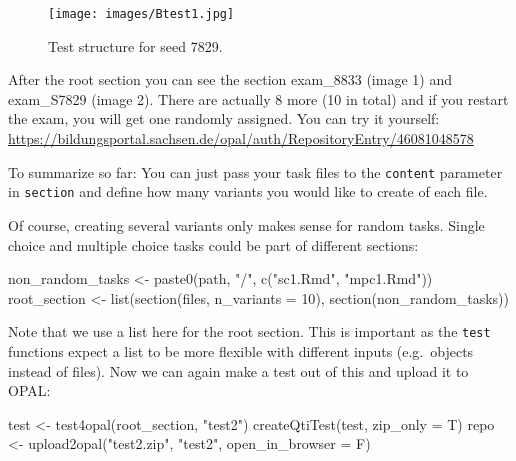 \documentclass[twoside]{tufte-book}
\newenvironment{Shaded}{}{}
\newcommand{\AttributeTok}[1]{\textcolor[rgb]{0.49,0.56,0.16}{#1}}
\newcommand{\DecValTok}[1]{\textcolor[rgb]{0.25,0.63,0.44}{#1}}
\newcommand{\FunctionTok}[1]{\textcolor[rgb]{0.02,0.16,0.49}{#1}}
\newcommand{\NormalTok}[1]{#1}
\newcommand{\OtherTok}[1]{\textcolor[rgb]{0.00,0.44,0.13}{#1}}
\newcommand{\StringTok}[1]{\textcolor[rgb]{0.25,0.44,0.63}{#1}}
\begin{document}
\begin{figure*}
\centering
\texttt{[image: images/Btest1.jpg]}
\caption{\label{b1}Test structure for seed 7829.}
\end{figure*}

After the root section you can see the section exam\_8833 (image 1) and exam\_S7829 (image 2). There are actually 8 more (10 in total) and if you restart the exam, you will get one randomly assigned. You can try it yourself: \url{https://bildungsportal.sachsen.de/opal/auth/RepositoryEntry/46081048578}

To summarize so far: You can just pass your task files to the \texttt{content} parameter in \texttt{section} and define how many variants you would like to create of each file.

Of course, creating several variants only makes sense for random tasks. Single choice and multiple choice tasks could be part of different sections:

\begin{Shaded}
\begin{Highlighting}[]
\NormalTok{non\_random\_tasks }\OtherTok{\textless{}{-}} \FunctionTok{paste0}\NormalTok{(path, }\StringTok{"/"}\NormalTok{, }\FunctionTok{c}\NormalTok{(}\StringTok{"sc1.Rmd"}\NormalTok{, }\StringTok{"mpc1.Rmd"}\NormalTok{))}
\NormalTok{root\_section }\OtherTok{\textless{}{-}} \FunctionTok{list}\NormalTok{(}\FunctionTok{section}\NormalTok{(files, }\AttributeTok{n\_variants =} \DecValTok{10}\NormalTok{),}
                     \FunctionTok{section}\NormalTok{(non\_random\_tasks))}
\end{Highlighting}
\end{Shaded}

Note that we use a list here for the root section. This is important as the \texttt{test} functions expect a list to be more flexible with different inputs (e.g.~objects instead of files). Now we can again make a test out of this and upload it to OPAL:

\begin{Shaded}
\begin{Highlighting}[]
\NormalTok{test }\OtherTok{\textless{}{-}} \FunctionTok{test4opal}\NormalTok{(root\_section, }\StringTok{"test2"}\NormalTok{)}
\FunctionTok{createQtiTest}\NormalTok{(test, }\AttributeTok{zip\_only =}\NormalTok{ T)}
\NormalTok{repo }\OtherTok{\textless{}{-}} \FunctionTok{upload2opal}\NormalTok{(}\StringTok{"test2.zip"}\NormalTok{, }\StringTok{"test2"}\NormalTok{, }\AttributeTok{open\_in\_browser =}\NormalTok{ F)}
\end{Highlighting}
\end{Shaded}
\end{document}
